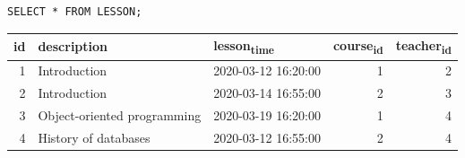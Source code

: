 \documentclass[11pt]{article}
\begin{document}
\begin{verbatim}
SELECT * FROM LESSON;
\end{verbatim}

\begin{center}
\begin{tabular}{rllrr}
id & description & lesson\textsubscript{time} & course\textsubscript{id} & teacher\textsubscript{id}\\
\hline
1 & Introduction & 2020-03-12 16:20:00 & 1 & 2\\
2 & Introduction & 2020-03-14 16:55:00 & 2 & 3\\
3 & Object-oriented programming & 2020-03-19 16:20:00 & 1 & 4\\
4 & History of databases & 2020-03-12 16:55:00 & 2 & 4\\
\end{tabular}
\end{center}
\end{document}
